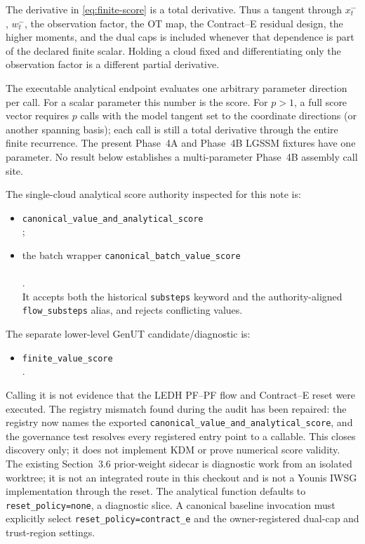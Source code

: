 \documentclass[11pt]{article}
\newcommand{\OT}{\ensuremath{\mathrm{OT}}}
\begin{document}
The derivative in \eqref{eq:finite-score} is a total derivative.  Thus a
tangent through $x_t^{-}$, $w_t^{-}$, the observation factor, the \OT{} map,
the Contract--E residual design, the higher moments, and the dual caps is
included whenever that dependence is part of the declared finite scalar.
Holding a cloud fixed and differentiating only the observation factor is a
different partial derivative.

The executable analytical endpoint evaluates one arbitrary parameter
direction per call.  For a scalar parameter this number is the score.  For
$p>1$, a full score vector requires $p$ calls with the model tangent set to
the coordinate directions (or another spanning basis); each call is still a
total derivative through the entire finite recurrence.  The present Phase~4A
and Phase~4B LGSSM fixtures have one parameter.  No result below establishes a
multi-parameter Phase~4B assembly call site.

The single-cloud analytical score authority inspected for this note is:
\begin{itemize}[leftmargin=2em]
  \item \texttt{canonical\_value\_and\_analytical\_score}\\
        ;
  \item the batch wrapper
        \texttt{canonical\_batch\_value\_score}\\
        \\
        .\\
        It accepts both the historical \texttt{substeps} keyword and the
        authority-aligned \texttt{flow\_substeps} alias, and rejects
        conflicting values.
\end{itemize}
The separate lower-level GenUT candidate/diagnostic is:
\begin{itemize}[leftmargin=2em]
  \item \texttt{finite\_value\_score}\\
        .
\end{itemize}
Calling it is not evidence that the LEDH PF--PF flow and Contract--E reset
were executed.  The registry mismatch found during the audit has been repaired:
the registry now names the exported
\texttt{canonical\_value\_and\_analytical\_score}, and the governance test
resolves every registered entry point to a callable.  This closes discovery
only; it does not implement KDM or prove numerical score validity.  The existing
Section~3.6 prior-weight sidecar is diagnostic work from an isolated worktree;
it is not an integrated route in this checkout and is not a Younis IWSG
implementation through the reset.  The analytical function defaults to
\texttt{reset\_policy=none}, a diagnostic slice.  A canonical baseline
invocation must explicitly select \texttt{reset\_policy=contract\_e} and the
owner-registered dual-cap and trust-region settings.
\end{document}
